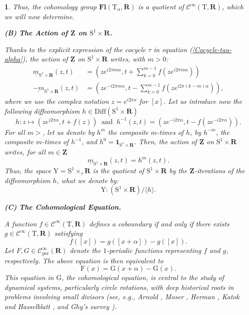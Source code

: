 \documentclass[10pt,letterpaper,reqno]{amsart}
\theoremstyle{article}
\newtheorem{article}[subsection]{}
\newcommand{\1}{{\hat 1}}
\newcommand{\0}{{\hat 0}}
\newcommand{\RR}{\mathbf R}
\newcommand{\ZZ}{\mathbf Z}
\def \F{\mathrm F}
\def \G{\mathrm G}
\def \S{\mathrm S}
\def \T{\mathrm T}
\def \Y{\mathrm Y}
\newcommand{\cl}[1]{\left[ #1 \right]}
\newcommand{\Cinfty}{\mathcal{C}^\infty}
\newcommand{\Diff}{\mathrm{Diff}}
\DeclareMathOperator{\Fb}{\boldsymbol{\mathsf{Fl}}}
\newcommand{\id}{\mathbf 1}
\newcommand{\per}{\mathrm{per}}
\renewcommand{\Fb}{\mathbf{Fl}}
\begin{document}
\begin{article}
    Thus,
    the cohomology group $\Fb(\T_\alpha,\RR)$ is a quotient of $\Cinfty(\T,\RR)$,
    which we will now determine.
    
    \smallskip\textbf{(B)}  \textbf{The Action of $\ZZ$ on $\S^1 \times \RR$.}
    
    Thanks to the explicit expression of the cocycle $\tau$ in equation (\ref{Cocycle-tau-alpha}),
    the action of $\ZZ$ on $\S^1 \times \RR$ writes,
    with $m>0$:
    $$
      \begin{aligned}
      \underline{m}_{\S^1 \times \RR}(z,t) & = \left(z e^{i2\pi m \alpha}, t + \sum_{k=0}^{m-1} f\left(ze^{i 2\pi m \alpha}\right)\right)  \\
      \underline{-m}_{\S^1 \times \RR}(z,t) & = \left(z e^{-i2\pi m \alpha}, t - \sum_{k=0}^{m-1} f\left(ze^{i 2\pi (k-m) \alpha}\right)\right),
      \end{aligned}
      $$
    where we use the complex notation $z = e^{i2\pi x}$ for $\cl{x}$.
    Let us introduce now the following diffeomorphism $h \in \Diff(\S^1\times \RR)$
    $$
      h : z \mapsto \left(z e^{i2\pi\alpha}, t + f(z)\right)
      \ \text{ and } \
      h^{-1}(z,t) = \left(z e^{-i2\pi\alpha}, t - f\left(z e^{-i2\pi\alpha}\right)\right).
      $$
    For all $m>$,
    let us denote by $h^m$ the composite $m$-times of $h$,
    by $h^{-m}$,
    the composite $m$-times of $h^{-1}$,
    and $h^0 = \id_{\S^1 \times \RR}$.
    Then,
    the action of $\ZZ$ on $\S^1 \times \RR$ writes,
    for all $m \in \ZZ$
    $$
      \underline{m}_{\S^1 \times \RR}(z,t) = h^m(z,t).
      $$
    Thus,
    the space $\Y = \S^1 \times_\tau \RR$ is the quotient of $\S^1 \times \RR$ by the $\ZZ$-iterations of the diffeomorphism $h$,
    what we denote by:
    $$
      \Y : (\S^1 \times \RR)/\langle h \rangle.
      $$
    
    \smallskip\textbf{(C)}  \textbf{The Cohomological Equation.}
    
    A function $f \in \Cinfty(\T,\RR)$ defines a coboundary if and only if there exists $g \in \Cinfty(\T,\RR)$ satisfying
    $$
      f(\cl{x}) = g(\cl{x+\alpha}) - g(\cl{x}).
      $$
    Let $F, G \in \Cinfty_{\per}(\RR)$ denote the $1$-periodic functions representing $f$ and $g$,
    respectively.
    The above equation is then equivalent to
    \begin{equation*}%
      \F(x) = \G(x+\alpha) - \G(x).
    \end{equation*}
    This equation in $\G$,
    the \emph{cohomological equation},
    is central to the study of dynamical systems,
    particularly circle rotations,
    with deep historical roots in problems involving small divisors
    (see, e.g., Arnold \cite{Arn65, Arn80}, Moser \cite{Mos66}, Herman \cite{Her79}, Katok and Hasselblatt \cite{KH95}, and Ghy's survey  \cite{Ghy07}).
    

\end{article}
\end{document}
